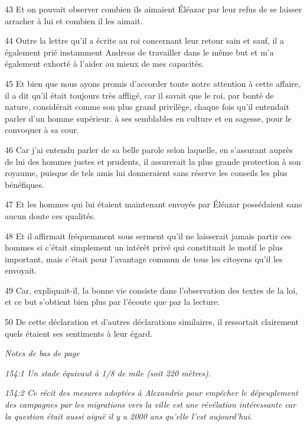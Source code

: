 \par 43 Et on pouvait observer combien ils aimaient Éléazar par leur refus de se laisser arracher à lui et combien il les aimait.

\par 44 Outre la lettre qu'il a écrite au roi concernant leur retour sain et sauf, il a également prié instamment Andreas de travailler dans le même but et m'a également exhorté à l'aider au mieux de mes capacités.

\par 45 Et bien que nous ayons promis d'accorder toute notre attention à cette affaire, il a dit qu'il était toujours très affligé, car il savait que le roi, par bonté de nature, considérait comme son plus grand privilège, chaque fois qu'il entendait parler d'un homme supérieur. à ses semblables en culture et en sagesse, pour le convoquer à sa cour.

\par 46 Car j'ai entendu parler de sa belle parole selon laquelle, en s'assurant auprès de lui des hommes justes et prudents, il assurerait la plus grande protection à son royaume, puisque de tels amis lui donneraient sans réserve les conseils les plus bénéfiques.

\par 47 Et les hommes qui lui étaient maintenant envoyés par Éléazar possédaient sans aucun doute ces qualités.

\par 48 Et il affirmait fréquemment sous serment qu'il ne laisserait jamais partir ces hommes si c'était simplement un intérêt privé qui constituait le motif le plus important, mais c'était pour l'avantage commun de tous les citoyens qu'il les envoyait.

\par 49 Car, expliquait-il, la bonne vie consiste dans l'observation des textes de la loi, et ce but s'obtient bien plus par l'écoute que par la lecture.

\par 50 De cette déclaration et d'autres déclarations similaires, il ressortait clairement quels étaient ses sentiments à leur égard.

\par \textit{Notes de bas de page}

\par \textit{154:1 Un stade équivaut à 1/8 de mile (soit 220 mètres).}

\par \textit{154:2 Ce récit des mesures adoptées à Alexandrie pour empêcher le dépeuplement des campagnes par les migrations vers la ville est une révélation intéressante car la question était aussi aiguë il y a 2000 ans qu'elle l'est aujourd'hui.}

